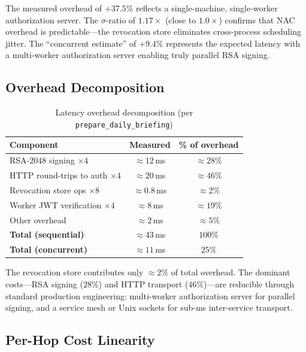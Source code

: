 \documentclass[journal]{IEEEtran}
\begin{document}
The measured overhead of $+37.5\%$ reflects a single-machine, single-worker
authorization server. The $\sigma$-ratio of $1.17\times$ (close to $1.0\times$)
confirms that NAC overhead is predictable---the revocation store eliminates
cross-process scheduling jitter. The ``concurrent estimate'' of $+9.4\%$
represents the expected latency with a multi-worker authorization server enabling
truly parallel RSA signing.

\subsection{Overhead Decomposition}
\label{sec:overhead}

\begin{table}[h]
\caption{Latency overhead decomposition (per \texttt{prepare\_daily\_briefing})}
\label{tab:decomp}
\centering
\footnotesize
\begin{tabular}{lcc}
\toprule
\textbf{Component} & \textbf{Measured} & \textbf{\% of overhead} \\
\midrule
RSA-2048 signing $\times 4$         & $\approx 12$\,ms & $\approx 28\%$ \\
HTTP round-trips to auth $\times 4$ & $\approx 20$\,ms & $\approx 46\%$ \\
Revocation store ops $\times 8$     & $\approx 0.8$\,ms & $\approx 2\%$ \\
Worker JWT verification $\times 4$  & $\approx 8$\,ms  & $\approx 19\%$ \\
Other overhead                      & $\approx 2$\,ms  & $\approx 5\%$  \\
\midrule
\textbf{Total (sequential)}         & $\approx 43$\,ms & $100\%$ \\
\textbf{Total (concurrent)}         & $\approx 11$\,ms & $25\%$  \\
\bottomrule
\end{tabular}
\end{table}

The revocation store contributes only $\approx 2\%$ of total overhead. The
dominant costs---RSA signing ($28\%$) and HTTP transport ($46\%$)---are
reducible through standard production engineering: multi-worker authorization
server for parallel signing, and a service mesh or Unix sockets for sub-ms
inter-service transport.

\subsection{Per-Hop Cost Linearity}
\end{document}
